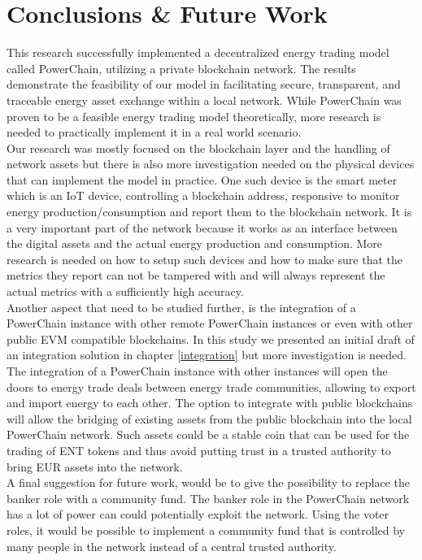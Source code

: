 \chapter{Conclusions \& Future Work} \label{conclusions}
This research successfully implemented a decentralized energy trading model called PowerChain, utilizing a private blockchain network. 
The results demonstrate the feasibility of our model in facilitating secure, transparent, and traceable energy asset exchange within a local network. 
While PowerChain was proven to be a feasible energy trading model theoretically, more research is needed to practically implement it in a real world 
scenario.\\
Our research was mostly focused on the blockchain layer and the handling of network assets but there is also more investigation needed on the
physical devices that can implement the model in practice. One such device is the smart meter which is an IoT device, controlling a blockchain address, 
responsive to monitor energy production/consumption and report them to the blockchain network. It is a very important part of the network
because it works as an interface between the digital assets and the actual energy production and consumption. More research is needed on how to setup such
devices and how to make sure that the metrics they report can not be tampered with and will always represent the actual metrics with a sufficiently high accuracy.\\
Another aspect that need to be studied further, is the integration of a PowerChain instance with other remote PowerChain instances or even with other public EVM compatible blockchains.
In this study we presented an initial draft of an integration solution in chapter \ref{integration} but more investigation is needed. The integration of a PowerChain instance
with other instances will open the doors to energy trade deals between energy trade communities, allowing to export and import energy to each other. The option to integrate with
public blockchains will allow the bridging of existing assets from the public blockchain into the local PowerChain network. Such assets could be a stable coin that can be used
for the trading of ENT tokens and thus avoid putting trust in a trusted authority to bring EUR assets into the network.\\
A final suggestion for future work, would be to give the possibility to replace the banker role with a community fund. The banker role in the PowerChain network has a lot of power
can could potentially exploit the network. Using the voter roles, it would be possible to implement a community fund that is controlled by many people in the network instead of a
central trusted authority.
